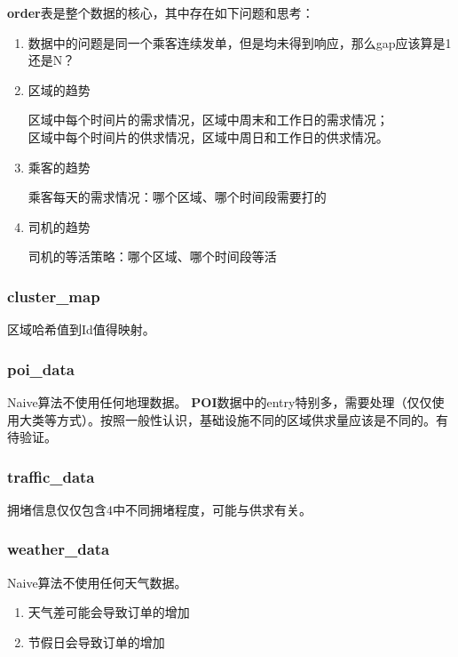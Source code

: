 \documentclass[hyperref,UTF8]{ctexart}
\theoremstyle{definition}
\theoremstyle{remark}
\numberwithin{equation}{subsection}
\newcommand{\Emph}{\textbf}
\begin{document}
	\Emph{order}表是整个数据的核心，其中存在如下问题和思考：
	\begin{enumerate}[(1)]
		
		\item 数据中的问题是同一个乘客连续发单，但是均未得到响应，那么gap应该算是1还是N？
		
		
		\item 区域的趋势
		
		区域中每个时间片的需求情况，区域中周末和工作日的需求情况；	\\
		区域中每个时间片的供求情况，区域中周日和工作日的供求情况。
		
		\item 乘客的趋势
		
		乘客每天的需求情况：哪个区域、哪个时间段需要打的
		
		\item 司机的趋势
		
		司机的等活策略：哪个区域、哪个时间段等活
		
	\end{enumerate}
	
\subsubsection{cluster\_map}

	区域哈希值到Id值得映射。

\subsubsection{poi\_data}

	Naive算法不使用任何地理数据。
	\Emph{POI}数据中的entry特别多，需要处理（仅仅使用大类等方式）。按照一般性认识，基础设施不同的区域供求量应该是不同的。有待验证。

\subsubsection{traffic\_data}

	拥堵信息仅仅包含4中不同拥堵程度，可能与供求有关。

\subsubsection{weather\_data}

	Naive算法不使用任何天气数据。
	\begin{enumerate}[(1)]
		
		\item 天气差可能会导致订单的增加
		
		\item 节假日会导致订单的增加
		
	\end{enumerate}
	
\end{document}
